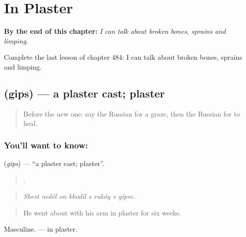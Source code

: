 
\chapter{In Plaster}
\label{ch:ru-in-plaster}

\begin{chapteropening}
\textbf{By the end of this chapter:} \emph{I can talk about broken bones, sprains and limping.}

Complete the last lesson of chapter 484: I can talk about broken bones, sprains and limping.
\end{chapteropening}

\section[\texorpdfstring{\ru{гипс} (gips)}{гипс (gips)}]{ (gips) — a plaster cast; plaster}

\label{lesson:RU-C484-gips}



\begin{quote}
Before the new one: say the Russian for a graze, then the Russian for to heal.
\end{quote}

\subsection*{You'll want to know: }
\textbf{} (\emph{gips}) — \textquotedblleft{}a plaster cast; plaster\textquotedblright{}.

\begin{quote}
       .
\end{quote}

\begin{quote}
\emph{Shest nedél on khodíl s rukóy v gípse.}
\end{quote}

\begin{quote}
He went about with his arm in plaster for six weeks.
\end{quote}

Masculine. \emph{ } — in plaster.

